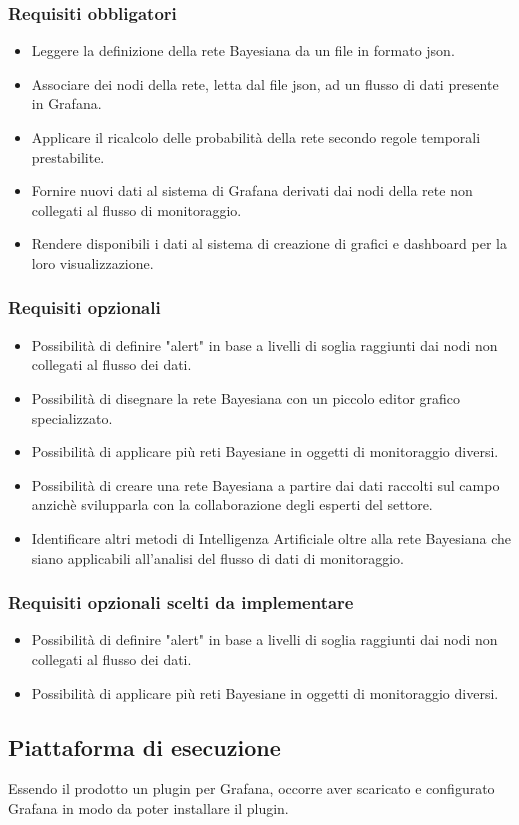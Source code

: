 				\subsubsection{Requisiti obbligatori}
				\begin{itemize}
					\item Leggere la definizione della rete Bayesiana da un file in formato json.
					\item Associare dei nodi della rete, letta dal file json, ad un flusso di dati presente in Grafana.
					\item Applicare il ricalcolo delle probabilità della rete secondo regole temporali prestabilite.
					\item Fornire nuovi dati al sistema di Grafana derivati dai nodi della rete non collegati al flusso di monitoraggio.
					\item Rendere disponibili i dati al sistema di creazione di grafici e dashboard per la loro visualizzazione.
		        \end{itemize}
				\subsubsection{Requisiti opzionali}
				\begin{itemize}
					\item Possibilità di definire "alert" in base a livelli di soglia raggiunti dai nodi non collegati al flusso dei dati.
					\item Possibilità di disegnare la rete Bayesiana con un piccolo editor grafico specializzato.
					\item Possibilità di applicare più reti Bayesiane in oggetti di monitoraggio diversi.
					\item Possibilità di creare una rete Bayesiana a partire dai dati raccolti sul campo anzichè svilupparla con la collaborazione degli esperti del settore.
					\item Identificare altri metodi di Intelligenza Artificiale oltre alla rete Bayesiana che siano applicabili all'analisi del flusso di dati di monitoraggio.
		        \end{itemize}
		        \subsubsection{Requisiti opzionali scelti da implementare}
				\begin{itemize}
					\item Possibilità di definire "alert" in base a livelli di soglia raggiunti dai nodi non collegati al flusso dei dati.
					\item Possibilità di applicare più reti Bayesiane in oggetti di monitoraggio diversi.
		        \end{itemize}
				
				
		\subsection{Piattaforma di esecuzione}			
Essendo il prodotto un plugin per Grafana, occorre aver scaricato e configurato Grafana in modo da poter installare il plugin.


\newpage
